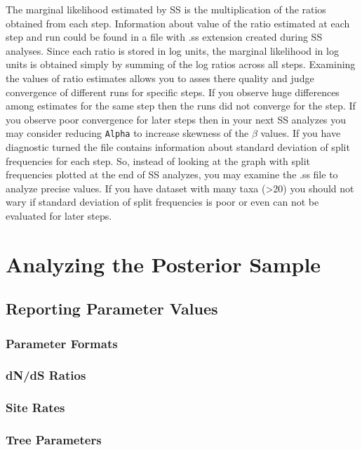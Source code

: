 \documentclass[12pt]{book}
\newcommand{\ttt}[1]{\texttt{#1} }
\begin{document}
The marginal likelihood estimated by SS is the multiplication of the ratios obtained from each
step.  Information about value of the ratio estimated at each step and run could be found in a file
with .ss extension created during SS analyses. Since each ratio is stored in log units, the
marginal likelihood in log units is obtained simply by summing of the log ratios across all steps.
Examining the values of ratio estimates allows you to asses there quality and judge convergence of
different runs for specific steps. If you observe huge differences among estimates for the same
step then the runs did not converge for the step. If you observe poor convergence for later steps
then in your next SS analyzes you may consider reducing \ttt{Alpha} to increase skewness of the
$\beta$ values.  If you have diagnostic turned the file contains information about standard
deviation of split frequencies for each step. So, instead of looking at the graph with split
frequencies plotted at the end of SS analyzes, you may examine the .ss file to analyze precise
values. If you have dataset with many taxa (>20) you should not wary if standard deviation of split
frequencies is poor or even can not be evaluated for later steps. 



\section{Analyzing the Posterior Sample}

\subsection{Reporting Parameter Values}

\subsubsection{Parameter Formats}

\subsubsection{dN/dS Ratios}

\subsubsection{Site Rates}

\subsubsection{Tree Parameters}
\end{document}
